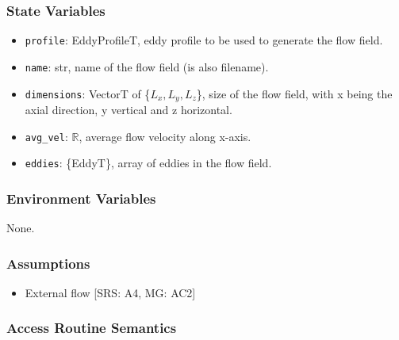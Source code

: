 \documentclass[12pt, titlepage]{article}
\begin{document}
\subsubsection{State Variables}
\begin{itemize}
  \item \texttt{profile}: EddyProfileT, eddy profile to be used to generate the flow field.
  \item \texttt{name}: str, name of the flow field (is also filename).
  \item \texttt{dimensions}: VectorT of \{$L_x, L_y, L_z$\}, size of the flow field, with x being the axial direction, y vertical and z horizontal.
  \item \texttt{avg\_vel}: $\mathbb{R}$, average flow velocity along x-axis.
  \item \texttt{eddies}: \{EddyT\}, array of eddies in the flow field.
\end{itemize}

\subsubsection{Environment Variables}
None.

\subsubsection{Assumptions}
\begin{itemize}
  \item External flow [SRS: A4, MG: AC2]
\end{itemize}

\subsubsection{Access Routine Semantics}
\end{document}
